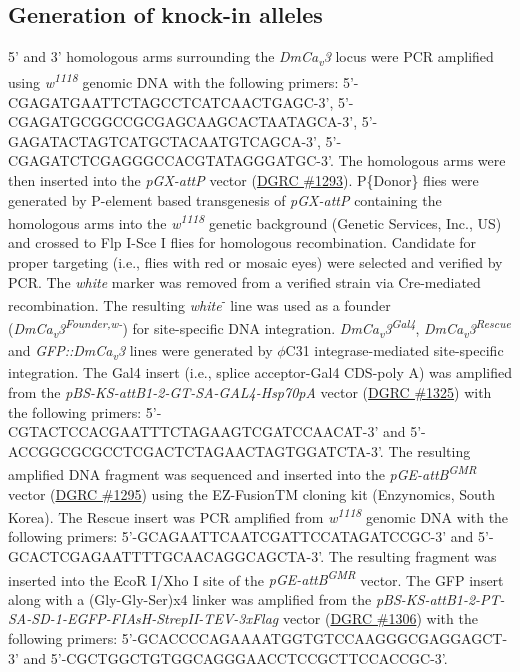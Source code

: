 \subsection*{Generation of knock-in alleles}

5' and 3' homologous arms surrounding the \emph{DmCa\textsubscript{v}3} locus were PCR amplified using \emph{w\textsuperscript{1118}} genomic DNA with the following primers: 5'-CGAGATGAATTCTAGCCTCATCAACTGAGC-3', 5'-CGAGATGCGGCCGCGAGCAAGCACTAATAGCA-3', 5'-GAGATACTAGTCATGCTACAATGTCAGCA-3', 5'-CGAGATCTCGAGGGCCACGTATAGGGATGC-3'.
The homologous arms were then inserted into the \emph{pGX-attP} vector (\href{https://dgrc.bio.indiana.edu/product/View?product=1293}{DGRC \#1293}).
P\{Donor\} flies were generated by P-element based transgenesis of \emph{pGX-attP} containing the homologous arms into the \emph{w\textsuperscript{1118}} genetic background (Genetic Services, Inc., US) and crossed to Flp I-Sce I flies for homologous recombination.
Candidate for proper targeting (i.e., flies with red or mosaic eyes) were selected and verified by PCR.
The \emph{white} marker was removed from a verified strain via Cre-mediated recombination.
The resulting \emph{white}\textsuperscript{-} line was used as a founder (\emph{DmCa\textsubscript{v}3\textsuperscript{Founder,w-}}) for site-specific DNA integration.
\emph{DmCa\textsubscript{v}3\textsuperscript{Gal4}}, \emph{DmCa\textsubscript{v}3\textsuperscript{Rescue}} and \emph{GFP::DmCa\textsubscript{v}3} lines were generated by $\phi$C31 integrase-mediated site-specific integration. 
The Gal4 insert (i.e., splice acceptor-Gal4 CDS-poly A) was amplified from the \emph{pBS-KS-attB1-2-GT-SA-GAL4-Hsp70pA} vector (\href{https://dgrc.bio.indiana.edu/product/View?product=1325}{DGRC \#1325}) with the following primers: 5'-CGTACTCCACGAATTTCTAGAAGTCGATCCAACAT-3' and 5'-ACCGGCGCGCCTCGACTCTAGAACTAGTGGATCTA-3'. 
The resulting amplified DNA fragment was sequenced and inserted into the \emph{pGE-attB\textsuperscript{GMR}} vector (\href{https://dgrc.bio.indiana.edu/product/View?product=1295}{DGRC \#1295}) using the EZ-FusionTM cloning kit (Enzynomics, South Korea). 
The Rescue insert was PCR amplified from \emph{w\textsuperscript{1118}} genomic DNA with the following primers: 5'-GCAGAATTCAATCGATTCCATAGATCCGC-3' and 5'-GCACTCGAGAATTTTGCAACAGGCAGCTA-3'.
The resulting fragment was inserted into the EcoR I/Xho I site of the \emph{pGE-attB\textsuperscript{GMR}} vector. 
The GFP insert along with a (Gly-Gly-Ser)x4 linker was amplified from the \emph{pBS-KS-attB1-2-PT-SA-SD-1-EGFP-FIAsH-StrepII-TEV-3xFlag} vector (\href{https://dgrc.bio.indiana.edu/product/View?product=1306}{DGRC \#1306}) with the following primers: 5'-GCACCCCAGAAAATGGTGTCCAAGGGCGAGGAGCT-3' and 5'-CGCTGGCTGTGGCAGGGAACCTCCGCTTCCACCGC-3'.
